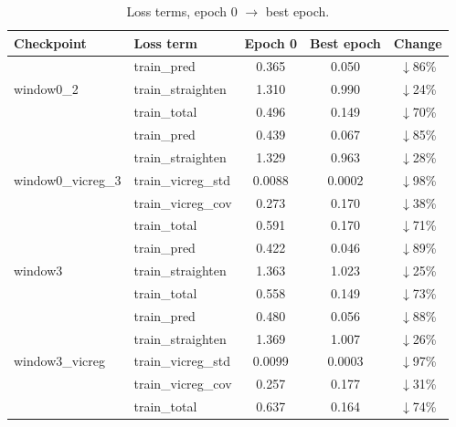 \begin{table}[H]
\centering
\caption{Loss terms, epoch 0 $\to$ best epoch.}
\label{tab:window-vicreg-losses}
\footnotesize
\begin{tabular}{llccc}
\toprule
Checkpoint & Loss term & Epoch 0 & Best epoch & Change \\
\midrule
\multirow{3}{*}{window0\_2}
 & train\_pred & 0.365 & 0.050 & $\downarrow$86\% \\
 & train\_straighten & 1.310 & 0.990 & $\downarrow$24\% \\
 & train\_total & 0.496 & 0.149 & $\downarrow$70\% \\
\midrule
\multirow{5}{*}{window0\_vicreg\_3}
 & train\_pred & 0.439 & 0.067 & $\downarrow$85\% \\
 & train\_straighten & 1.329 & 0.963 & $\downarrow$28\% \\
 & train\_vicreg\_std & 0.0088 & 0.0002 & $\downarrow$98\% \\
 & train\_vicreg\_cov & 0.273 & 0.170 & $\downarrow$38\% \\
 & train\_total & 0.591 & 0.170 & $\downarrow$71\% \\
\midrule
\multirow{3}{*}{window3}
 & train\_pred & 0.422 & 0.046 & $\downarrow$89\% \\
 & train\_straighten & 1.363 & 1.023 & $\downarrow$25\% \\
 & train\_total & 0.558 & 0.149 & $\downarrow$73\% \\
\midrule
\multirow{5}{*}{window3\_vicreg}
 & train\_pred & 0.480 & 0.056 & $\downarrow$88\% \\
 & train\_straighten & 1.369 & 1.007 & $\downarrow$26\% \\
 & train\_vicreg\_std & 0.0099 & 0.0003 & $\downarrow$97\% \\
 & train\_vicreg\_cov & 0.257 & 0.177 & $\downarrow$31\% \\
 & train\_total & 0.637 & 0.164 & $\downarrow$74\% \\
\bottomrule
\end{tabular}
\end{table}

